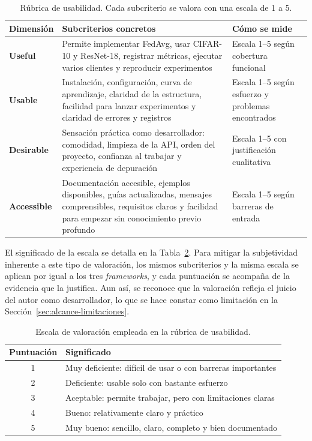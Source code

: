 \begin{table}[htbp]
  \centering
  \small
  \caption{Rúbrica de usabilidad. Cada subcriterio se valora con una escala de 1 a 5.}
  \label{tab:rubrica-ux}
  \begin{tabular}{>{\bfseries}l p{} p{}}
    \toprule
    \normalfont Dimensión & \normalfont Subcriterios concretos & \normalfont Cómo se mide \\
    \midrule
    Useful &
    Permite implementar FedAvg, usar CIFAR-10 y ResNet-18, registrar métricas, ejecutar varios
    clientes y reproducir experimentos &
    Escala 1--5 según cobertura funcional \\
    \addlinespace
    Usable &
    Instalación, configuración, curva de aprendizaje, claridad de la estructura, facilidad para
    lanzar experimentos y claridad de errores y registros &
    Escala 1--5 según esfuerzo y problemas encontrados \\
    \addlinespace
    Desirable &
    Sensación práctica como desarrollador: comodidad, limpieza de la API, orden del proyecto,
    confianza al trabajar y experiencia de depuración &
    Escala 1--5 con justificación cualitativa \\
    \addlinespace
    Accessible &
    Documentación accesible, ejemplos disponibles, guías actualizadas, mensajes comprensibles,
    requisitos claros y facilidad para empezar sin conocimiento previo profundo &
    Escala 1--5 según barreras de entrada \\
    \bottomrule
  \end{tabular}
\end{table}

El significado de la escala se detalla en la Tabla~\ref{tab:escala-ux}. Para mitigar la
subjetividad inherente a este tipo de valoración, los mismos subcriterios y la misma escala se
aplican por igual a los tres \textit{frameworks}, y cada puntuación se acompaña de la evidencia que
la justifica. Aun así, se reconoce que la valoración refleja el juicio del autor como
desarrollador, lo que se hace constar como limitación en la
Sección~\ref{sec:alcance-limitaciones}.

\begin{table}[htbp]
  \centering
  \small
  \caption{Escala de valoración empleada en la rúbrica de usabilidad.}
  \label{tab:escala-ux}
  \begin{tabular}{cl}
    \toprule
    Puntuación & Significado \\
    \midrule
    1 & Muy deficiente: difícil de usar o con barreras importantes \\
    2 & Deficiente: usable solo con bastante esfuerzo \\
    3 & Aceptable: permite trabajar, pero con limitaciones claras \\
    4 & Bueno: relativamente claro y práctico \\
    5 & Muy bueno: sencillo, claro, completo y bien documentado \\
    \bottomrule
  \end{tabular}
\end{table}

